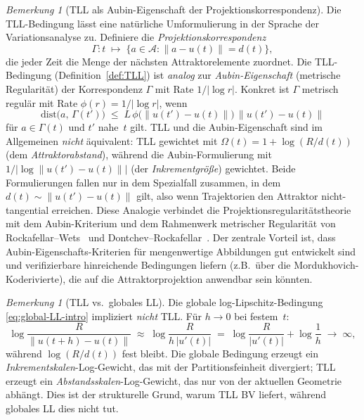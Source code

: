 \documentclass[12pt,a4paper]{article}
\theoremstyle{definition}
\theoremstyle{plain}
\theoremstyle{remark}
\newtheorem{remark}[definition]{Bemerkung}
\newcommand{\dist}{\mathrm{dist}}
\begin{document}
\begin{remark}[TLL als Aubin-Eigenschaft der Projektionskorrespondenz]
\label{rem:TLL-Aubin}
Die TLL-Bedingung lässt eine natürliche Umformulierung in der
Sprache der Variationsanalyse zu.  Definiere die
\emph{Projektionskorrespondenz}
\[
  \Gamma: t \;\mapsto\;
  \bigl\{a \in \mathcal{A} : \|a - u(t)\| = d(t)\bigr\},
\]
die jeder Zeit die Menge der nächsten Attraktorelemente zuordnet.
Die TLL-Bedingung (Definition~\ref{def:TLL}) ist \emph{analog} zur
\emph{Aubin-Eigenschaft} (metrische Regularität) der Korrespondenz
$\Gamma$ mit Rate $1/|\log r|$.  Konkret ist $\Gamma$ metrisch
regulär mit Rate $\phi(r) = 1/|\log r|$, wenn
\[
  \dist\bigl(a,\, \Gamma(t')\bigr)
  \;\le\;
  L\,\phi\bigl(\|u(t') - u(t)\|\bigr)\,\|u(t') - u(t)\|
\]
für $a \in \Gamma(t)$ und $t'$ nahe~$t$ gilt.
TLL und die Aubin-Eigenschaft sind im Allgemeinen \emph{nicht}
äquivalent: TLL gewichtet mit
$\Omega(t) = 1 + \log(R/d(t))$ (dem \emph{Attraktorabstand}),
während die Aubin-Formulierung mit
$1/|\log\|u(t')-u(t)\||$ (der \emph{Inkrementgröße}) gewichtet.
Beide Formulierungen fallen nur in dem Spezialfall zusammen, in dem
$d(t) \sim \|u(t')-u(t)\|$ gilt, also wenn Trajektorien den Attraktor
nicht-tangential erreichen.  Diese Analogie verbindet die
Projektionsregularitätstheorie mit dem Aubin-Kriterium und dem
Rahmenwerk metrischer Regularität von
Rockafellar--Wets~\cite{RockafellarWets1998} und
Dontchev--Rockafellar~\cite{DontchevRockafellar2009}.
Der zentrale Vorteil ist, dass Aubin-Eigenschafts-Kriterien für
mengenwertige Abbildungen gut entwickelt sind und verifizierbare
hinreichende Bedingungen liefern (z.B.\ über die
Mordukhovich-Koderivierte), die auf die Attraktorprojektion
anwendbar sein könnten.
\end{remark}

\begin{remark}[TLL vs.\ globales LL]
\label{rem:TLL-vs-LL}
Die globale log-Lipschitz-Bedingung \eqref{eq:global-LL-intro}
impliziert \emph{nicht} TLL.  Für $h \to 0$ bei festem~$t$:
\[
  \log\frac{R}{\|u(t+h)-u(t)\|}
  \;\approx\;
  \log\frac{R}{h\,|u'(t)|}
  \;=\;
  \log\frac{R}{|u'(t)|} + \log\frac{1}{h}
  \;\to\; \infty,
\]
während $\log(R/d(t))$ fest bleibt.  Die globale Bedingung
erzeugt ein \emph{Inkrementskalen}-Log-Gewicht, das mit der
Partitionsfeinheit divergiert; TLL erzeugt ein
\emph{Abstandsskalen}-Log-Gewicht, das nur von der aktuellen
Geometrie abhängt.  Dies ist der strukturelle Grund, warum TLL
BV liefert, während globales LL dies nicht tut.
\end{remark}
\end{document}
